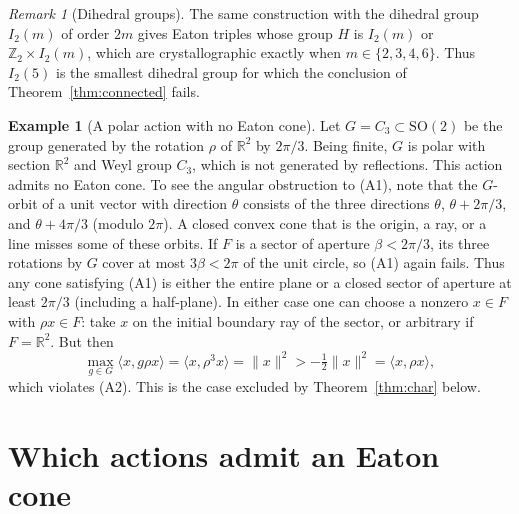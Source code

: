 \documentclass[11pt]{amsart}
\theoremstyle{plain}
\theoremstyle{definition}
\newtheorem{example}[theorem]{Example}
\theoremstyle{remark}
\newtheorem{remark}[theorem]{Remark}
\newcommand{\R}{\mathbb R}
\newcommand{\Z}{\mathbb Z}
\newcommand{\ip}[2]{\langle #1,#2\rangle}
\begin{document}
\begin{remark}[Dihedral groups]
The same construction with the dihedral group $I_2(m)$ of order $2m$ gives Eaton triples whose group $H$ is $I_2(m)$ or $\Z_2\times I_2(m)$, which are crystallographic exactly when $m\in\{2,3,4,6\}$. Thus $I_2(5)$ is the smallest dihedral group for which the conclusion of Theorem~\ref{thm:connected} fails.
\end{remark}

\begin{example}[A polar action with no Eaton cone]\label{ex:C3}
Let $G=C_3\subset \mathrm{SO}(2)$ be the group generated by the rotation $\rho$ of $\R^2$ by $2\pi/3$. Being finite, $G$ is polar with section $\R^2$ and Weyl group $C_3$, which is not generated by reflections. This action admits no Eaton cone. To see the angular obstruction to (A1), note that the $G$-orbit of a unit vector with direction $\theta$ consists of the three directions $\theta$, $\theta+2\pi/3$, and $\theta+4\pi/3$ (modulo $2\pi$). A closed convex cone that is the origin, a ray, or a line misses some of these orbits. If $F$ is a sector of aperture $\beta<2\pi/3$, its three rotations by $G$ cover at most $3\beta<2\pi$ of the unit circle, so (A1) again fails. Thus any cone satisfying (A1) is either the entire plane or a closed sector of aperture at least $2\pi/3$ (including a half-plane). In either case one can choose a nonzero $x\in F$ with $\rho x\in F$: take $x$ on the initial boundary ray of the sector, or arbitrary if $F=\R^2$. But then
\[
\max_{g\in G}\ip{x}{g\rho x}=\ip{x}{\rho^3x}=\|x\|^2>-\tfrac12\|x\|^2=\ip{x}{\rho x},
\]
which violates (A2). This is the case excluded by Theorem~\ref{thm:char} below.
\end{example}

\section{Which actions admit an Eaton cone}\label{sec:char}
\end{document}
